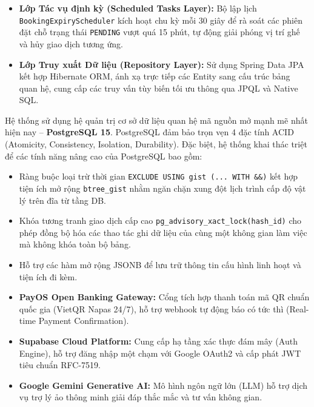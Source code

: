 \begin{itemize}
\begin{itemize}
    \end{itemize}
    \item \textbf{Lớp Tác vụ định kỳ (Scheduled Tasks Layer):} Bộ lập lịch \texttt{BookingExpiryScheduler} kích hoạt chu kỳ mỗi 30 giây để rà soát các phiên đặt chỗ trạng thái \texttt{PENDING} vượt quá 15 phút, tự động giải phóng vị trí ghế và hủy giao dịch tương ứng.
    \item \textbf{Lớp Truy xuất Dữ liệu (Repository Layer):} Sử dụng Spring Data JPA kết hợp Hibernate ORM, ánh xạ trực tiếp các Entity sang cấu trúc bảng quan hệ, cung cấp các truy vấn tùy biến tối ưu thông qua JPQL và Native SQL.
\end{itemize}


Hệ thống sử dụng hệ quản trị cơ sở dữ liệu quan hệ mã nguồn mở mạnh mẽ nhất hiện nay -- \textbf{PostgreSQL 15}. PostgreSQL đảm bảo trọn vẹn 4 đặc tính ACID (Atomicity, Consistency, Isolation, Durability). Đặc biệt, hệ thống khai thác triệt để các tính năng nâng cao của PostgreSQL bao gồm:
\begin{itemize}
    \item Ràng buộc loại trừ thời gian \texttt{EXCLUDE USING gist (... WITH \&\&)} kết hợp tiện ích mở rộng \texttt{btree\_gist} nhằm ngăn chặn xung đột lịch trình cấp độ vật lý trên đĩa từ tầng DB.
    \item Khóa tương tranh giao dịch cấp cao \texttt{pg\_advisory\_xact\_lock(hash\_id)} cho phép đồng bộ hóa các thao tác ghi dữ liệu của cùng một không gian làm việc mà không khóa toàn bộ bảng.
    \item Hỗ trợ các hàm mở rộng JSONB để lưu trữ thông tin cấu hình linh hoạt và tiện ích đi kèm.
\end{itemize}


\begin{itemize}
    \item \textbf{PayOS Open Banking Gateway:} Cổng tích hợp thanh toán mã QR chuẩn quốc gia (VietQR Napas 24/7), hỗ trợ webhook tự động báo có tức thì (Real-time Payment Confirmation).
    \item \textbf{Supabase Cloud Platform:} Cung cấp hạ tầng xác thực đám mây (Auth Engine), hỗ trợ đăng nhập một chạm với Google OAuth2 và cấp phát JWT tiêu chuẩn RFC-7519.
    \item \textbf{Google Gemini Generative AI:} Mô hình ngôn ngữ lớn (LLM) hỗ trợ dịch vụ trợ lý ảo thông minh giải đáp thắc mắc và tư vấn không gian.
\end{itemize}

